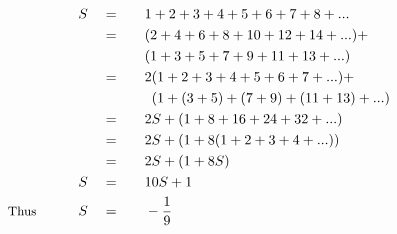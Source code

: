 \begin{alignat*}{5}
&\,&S\quad&=\quad&&1+2+3+4+5+6+7+8+...\\
&\,&\,&=&&(2+4+6+8+10+12+14+...)+\\
&\,&\,&\,&&(1+3+5+7+9+11+13+...)\\
&\,&\,&=&&2(1+2+3+4+5+6+7+...)+\\
&\,&\,&\,&&~\,(1+(3+5)+(7+9)+(11+13)+...)\\
&\,&\,&=&&2S+(1+8+16+24+32+...)\\
&\,&\,&=&&2S+(1+8(1+2+3+4+...))\\
&\,&\,&=&&2S+(1+8S)\\
&\,&S\quad&=&&10S+1\\
&\small\text{Thus}\normalsize\qquad&S\quad&=&&-\frac{1}{9}
\end{alignat*}
